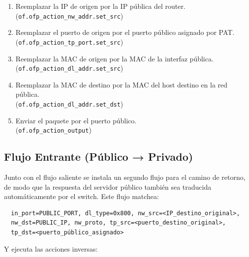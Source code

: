 \documentclass[11pt, a4paper]{article}
\begin{document}
\begin{enumerate}
    \item Reemplazar la IP de origen por la IP pública del router. \\
          (\texttt{of.ofp\_action\_nw\_addr.set\_src})

    \item Reemplazar el puerto de origen por el puerto público asignado por PAT. \\
          (\texttt{of.ofp\_action\_tp\_port.set\_src})

    \item Reemplazar la MAC de origen por la MAC de la interfaz pública. \\
          (\texttt{of.ofp\_action\_dl\_addr.set\_src})

    \item Reemplazar la MAC de destino por la MAC del host destino en la red pública. \\
          (\texttt{of.ofp\_action\_dl\_addr.set\_dst})

    \item Enviar el paquete por el puerto público. \\
          (\texttt{of.ofp\_action\_output})
\end{enumerate}

\subsection{Flujo Entrante (Público → Privado)}
\label{subsec:flow_in}

Junto con el flujo saliente se instala un segundo flujo para el camino de retorno, de modo que la respuesta del servidor público también sea traducida automáticamente por el switch. Este flujo matchea:

\begin{verbatim}
  in_port=PUBLIC_PORT, dl_type=0x800, nw_src=<IP_destino_original>,
  nw_dst=PUBLIC_IP, nw_proto, tp_src=<puerto_destino_original>,
  tp_dst=<puerto_público_asignado>
\end{verbatim}

Y ejecuta las acciones inversas:
\end{document}

